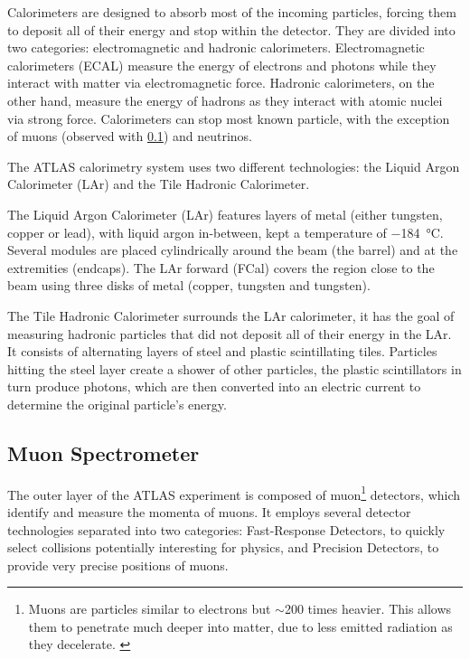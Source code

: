 Calorimeters are designed to absorb most of the incoming particles, forcing them to deposit all of their energy and stop within the detector. They are divided into two categories: electromagnetic and hadronic calorimeters. Electromagnetic calorimeters (ECAL) measure the energy of electrons and photons while they interact with matter via electromagnetic force. Hadronic calorimeters, on the other hand, measure the energy of hadrons as they interact with atomic nuclei via strong force. Calorimeters can stop most known particle, with the exception of muons (observed with \ref{sec:muon_spectrometer}) and neutrinos.

The ATLAS calorimetry system uses two different technologies: the Liquid Argon Calorimeter (LAr) and the Tile Hadronic Calorimeter.

The Liquid Argon Calorimeter (LAr) features layers of metal (either tungsten, copper or lead), with liquid argon in-between, kept a temperature of \qty{-184}{\degreeCelsius}. Several modules are placed cylindrically around the beam (the barrel) and at the extremities (endcaps). The LAr forward (FCal) covers the region close to the beam using three disks of metal (copper, tungsten and tungsten).

The Tile Hadronic Calorimeter surrounds the LAr calorimeter, it has the goal of measuring hadronic particles that did not deposit all of their energy in the LAr. It consists of alternating layers of steel and plastic scintillating tiles. Particles hitting the steel layer create a shower of other particles, the plastic scintillators in turn produce photons, which are then converted into an electric current to determine the original particle's energy.

\subsection{Muon Spectrometer}\label{sec:muon_spectrometer}

The outer layer of the ATLAS experiment is composed of muon\footnote{Muons are particles similar to electrons but $\sim$200 times heavier. This allows them to penetrate much deeper into matter, due to less emitted radiation as they decelerate. \label{footnote:muons}} detectors, which identify and measure the momenta of muons. It employs several detector technologies separated into two categories: Fast-Response Detectors, to quickly select collisions potentially interesting for physics, and Precision Detectors, to provide very precise positions of muons.

